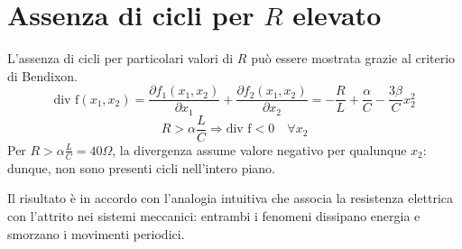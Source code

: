 \section{Assenza di cicli per $R$ elevato}
L'assenza di cicli per particolari valori di $R$ può essere mostrata grazie al criterio di Bendixon.
\begin{equation}
    \textrm{div f}(x_1, x_2) = \frac{\partial f_1(x_1,x_2)}{\partial x_1} + \frac{\partial f_2(x_1,x_2)}{\partial x_2} = -\frac{R}{L} + \frac{\alpha}{C} - \frac{3\beta}{C}x_2^2
\end{equation}
\begin{equation}\label{big-resistance}
    R > \alpha \frac{L}{C} \Longrightarrow \textrm{div f}<0 \quad \forall x_2
\end{equation}
Per $R > \alpha \frac{L}{C} = 40 \Omega$, la divergenza assume valore negativo per qualunque $x_2$: dunque, non sono presenti cicli nell'intero piano.

Il risultato è in accordo con l'analogia intuitiva che associa la resistenza elettrica con l'attrito nei sistemi meccanici: entrambi i fenomeni dissipano energia e smorzano i movimenti periodici.
